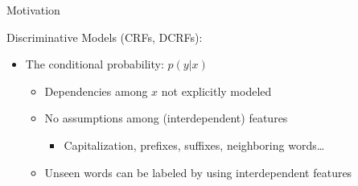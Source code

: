 \documentclass[presentation,bigger]{beamer}
\begin{document}
\begin{frame}[label={sec:orgheadline4}]{Motivation}
\begin{block}{Discriminative Models (CRFs, DCRFs):}
\begin{itemize}
\item The conditional probability: \(p(y|x)\)
\begin{itemize}
\item Dependencies among \(x\) not explicitly modeled
\item No assumptions among (interdependent) features
\begin{itemize}
\item Capitalization, prefixes, suffixes, neighboring words\ldots{}
\end{itemize}
\item Unseen words can be labeled by using interdependent features
\end{itemize}
\end{itemize}
\end{block}
\end{frame}
\end{document}
